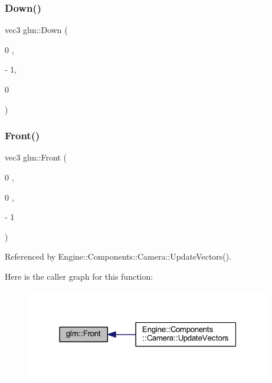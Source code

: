 \mbox{\label{namespaceglm_a7cc55d622858c4483a942b659dbee30d}} 
\subsubsection{\texorpdfstring{Down()}{Down()}}
{\footnotesize\ttfamily vec3 glm\+::\+Down (\begin{DoxyParamCaption}\item[{0}]{,  }\item[{-\/}]{1,  }\item[{0}]{ }\end{DoxyParamCaption})}

\mbox{\label{namespaceglm_a95e780de06846d0eee634d15187b87ab}} 
\subsubsection{\texorpdfstring{Front()}{Front()}}
{\footnotesize\ttfamily vec3 glm\+::\+Front (\begin{DoxyParamCaption}\item[{0}]{,  }\item[{0}]{,  }\item[{-\/}]{1 }\end{DoxyParamCaption})}



Referenced by Engine\+::\+Components\+::\+Camera\+::\+Update\+Vectors().

Here is the caller graph for this function\+:
\nopagebreak
\begin{figure}[H]
\begin{center}
\leavevmode
\includegraphics[width=304pt]{namespaceglm_a95e780de06846d0eee634d15187b87ab_icgraph}
\end{center}
\end{figure}
\mbox{\label{namespaceglm_a23fef243f5fe738c94f80aad5bf5087d}} 
